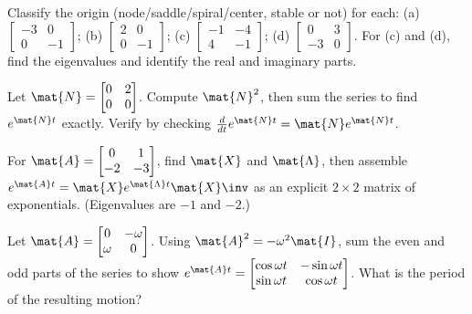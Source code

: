 \begin{exercise}
\label{ch25:ex-portrait}
Classify the origin (node/saddle/spiral/center, stable or not) for each:
(a) $\begin{bmatrix}-3&0\\0&-1\end{bmatrix}$;
(b) $\begin{bmatrix}2&0\\0&-1\end{bmatrix}$;
(c) $\begin{bmatrix}-1&-4\\4&-1\end{bmatrix}$;
(d) $\begin{bmatrix}0&3\\-3&0\end{bmatrix}$.
For (c) and (d), find the eigenvalues and identify the real and imaginary parts.
\end{exercise}

\begin{exercise}
\label{ch25:ex-series}
Let $\mat{N}=\begin{bmatrix}0&2\\0&0\end{bmatrix}$. Compute $\mat{N}^2$, then sum
the series to find $e^{\mat{N}t}$ exactly. Verify by checking
$\frac{d}{dt}e^{\mat{N}t}=\mat{N}e^{\mat{N}t}$.
\end{exercise}

\begin{exercise}
\label{ch25:ex-diag}
For $\mat{A}=\begin{bmatrix}0&1\\-2&-3\end{bmatrix}$, find $\mat{X}$ and
$\mat{\Lambda}$, then assemble $e^{\mat{A}t}=\mat{X}e^{\mat{\Lambda}t}\mat{X}\inv$
as an explicit $2\times2$ matrix of exponentials. (Eigenvalues are $-1$ and $-2$.)
\end{exercise}

\begin{exercise}
\label{ch25:ex-rotation}
Let $\mat{A}=\begin{bmatrix}0&-\omega\\\omega&0\end{bmatrix}$. Using
$\mat{A}^2=-\omega^2\mat{I}$, sum the even and odd parts of the series to show
$e^{\mat{A}t}=\begin{bmatrix}\cos\omega t&-\sin\omega t\\\sin\omega t&\cos\omega t
\end{bmatrix}$. What is the period of the resulting motion?
\end{exercise}

